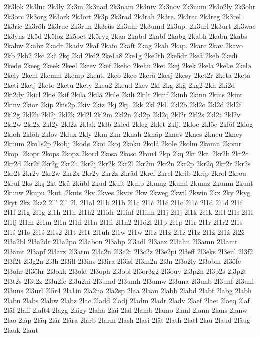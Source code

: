 2k3lok
2k3lüc
2k3ly
2k3m
2k3nad
2k3nam
2k3niv
2k3nov
2k3num
2k3o2ly
2k3ohr
2k3orc
2k3org
2k3ork
2k3ört
2k3p
2k3rad
2k3rah
2k3re.
2k3rec
2k3reg
2k3rel
2k3ric
2k3röh
2k3ruc
2k3run
2k3rüs
2k3uhr
2k3umd
2k3up.
2k3url
2k3urt
2k3wac
2k3yns
2k5d
2k5loz
2k5oct
2k5ryg
2kaa
2kabd
2kabf
2kabg
2kabh
2kabn
2kabs
2kabw
2kabz
2kadr
2kadv
2kaf
2kafo
2kaft
2kag
2kah
2kap.
2karc
2kav
2kavo
2kb
2kb2
2kc
2kč
2kç
2kd
2kd2
2ke1a8
2ke1g
2ke2th
2ke5dr
2keå
2keb
2kedi
2kedø
2keeg
2keek
2keel
2keev
2kef
2keho
2kehu
2kei
2kej
2kek
2kela
2kelæ
2kelø
2kely
2kem
2kemm
2kemp
2kent.
2keo
2keø
2kerå
2kesj
2kesy
2ket2r
2keta
2ketå
2keti
2ketj
2keto
2ketu
2kety
2keu2
2keud
2kev
2kf
2kg
2kğ
2kg2
2kh
2ki2d
2ki2dy
2kicl
2kië
2kif
2kila
2kilä
2kile
2kili
2kilt
2kinf
2kinh
2kinn
2kins
2kint
2kinv
2kior
2kip
2kis2p
2kiv
2kiz
2kj
2kj.
2kk
2kl
2kl.
2kl2b
2kl2c
2kl2d
2kl2f
2kl2g
2kl2h
2kl2j
2kl2k
2kl2l
2kl2m
2kl2n
2kl2p
2kl2q
2kl2r
2kl2s
2kl2t
2kl2v
2kl2w
2kl2x
2kl2y
2kl2z
2klak
2kłb
2kled
2kleg
2klet
2klj.
2kloc
2klöc
2klöf
2klog
2kloh
2klöh
2klov
2klux
2kly
2km
2kn
2knah
2knäp
2knav
2knes
2kneu
2kney
2knum
2ko1s2p
2kobj
2kodø
2koi
2koj
2koku
2kolå
2kole
2kolm
2komn
2komr
2kop.
2kopr
2kops
2kopz
2kord
2kosa
2koso
2kou4
2kp
2kq
2kr
2kr.
2kr2b
2kr2c
2kr2d
2kr2f
2kr2g
2kr2h
2kr2j
2kr2k
2kr2l
2kr2m
2kr2n
2kr2p
2kr2q
2kr2r
2kr2s
2kr2t
2kr2v
2kr2w
2kr2x
2kr2y
2kr2z
2kräd
2kref
2krel
2krib
2krip
2krol
2krou
2kruf
2ks
2kş
2kt
2kû
2kübl
2kud
2kuit
2kulp
2kumg
2kuml
2kumz
2kunm
2kunt
2kunw
2kupu
2kut.
2kuts
2kv
2kves
2kviv
2kw
2kweg
2kwil
2kwin
2kx
2ky
2kyg
2kyt
2kz
2kz2
2l''
2l'.
2l.
2l1al
2l1b
2ł1b
2l1c
2l1ć
2l1č
2ł1c
2ł1ć
2l1d
2ł1d
2l1f
2ł1f
2l1g
2ł1g
2l1h
2ł1h
2l1h2
2l1idr
2l1inf
2l1inn
2l1j
2ł1j
2l1k
2ł1k
2l1l
2l1ł
2ł1l
2l1lj
2l1m
2ł1m
2l1n
2l1ń
2ł1n
2ł1ń
2l1n2
2l1ö2l
2l1p
2ł1p
2l1r
2ł1r
2l1r2
2l1s
2l1ś
2ł1s
2ł1ś
2l1s2
2l1t
2ł1t
2l1uh
2l1w
2ł1w
2l1z
2l1ź
2l1ż
2ł1z
2ł1ź
2ł1ż
2l2ž
2l3a2bl
2l3a2dr
2l3a2po
2l3abon
2l3abp
2l3adl
2l3aex
2l3ähn
2l3amn
2l3amt
2l3ämt
2l3apf
2l3ärz
2l3atm
2l3c2n
2l3c2t
2l3c2z
2l3e2pi
2l3eff
2l3eks
2l3eul
2l3f2
2l3f2t
2l3g2n
2l3h
2l3ill
2l3ins
2l3ira
2l3isl
2l3m2n
2l3n
2l3o2ly
2l3obm
2l3öfe
2l3ohr
2l3öhr
2l3okk
2l3okt
2l3oph
2l3opl
2l3or3g2
2l3ouv
2l3p2n
2l3p2s
2l3p2t
2l3t2s
2l3t2z
2l3u2fe
2l3u2ni
2l3umd
2l3umh
2l3umw
2l3una
2l3unb
2l3unf
2l3unl
2l3uns
2l3url
2l5r4
2la1in
2la2nä
2la2sp
2laa
2laan
2labb
2labd
2labf
2labg
2labh
2labn
2labs
2labw
2labz
2lac
2ladd
2ladj
2ladm
2ladr
2ladv
2laef
2laei
2laeq
2laf
2läf
2laff
2laft4
2lagg
2lägy
2laha
2låi
2lal
2lamb
2lamo
2lanl
2lann
2lans
2lanw
2lao
2låp
2läq
2lår
2lära
2larb
2larm
2lash
2lasi
2lät
2lath
2latl
2lau
2laud
2läug
2lauk
2laut
